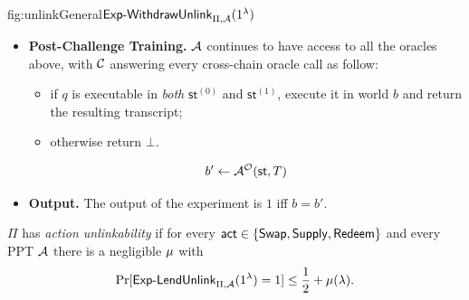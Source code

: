 \begin{ExpFig}{fig:unlinkGeneral}{$\mathsf{Exp\text{-}WithdrawUnlink}_{\Pi,\mathcal{A}}(1^{\lambda})$}
\begin{itemize}[leftmargin=1.4em,itemsep=3pt]
\begin{itemize}[nosep,leftmargin=1.4em]
\begin{enumerate}
    \item
     Let $\mathsf{st}^{(0)}$ and $\mathsf{st}^{(1)}$ denote the states of the honest
      parties in the two worlds: $\mathsf{st}^{(\beta)}$ is the state that results from
      running $\act$ on behalf of $\mathsf{shAcct}_{\beta}$. The challenger executes the
      challenge in world $b$ and \textbf{retains both} $\mathsf{st}^{(0)}$ and
      $\mathsf{st}^{(1)}$.
  \end{enumerate}
  \end{itemize}
\item \textbf{Post-Challenge Training.} $\mathcal{A}$ continues to have access to all the oracles above,  with $\mathcal{C}$ answering every cross-chain oracle call as follow:
      \begin{itemize}[nosep,leftmargin=1.4em,topsep=2pt]
      \item if $q$ is executable in \emph{both} $\mathsf{st}^{(0)}$ and
            $\mathsf{st}^{(1)}$, execute it in world $b$ and return the resulting
            transcript;
      \item otherwise return $\bot$.
      \end{itemize}
      $$b' \gets \mathcal{A}^{\mathcal{O}}(\mathsf{st}, T)$$
\item \textbf{Output.} The output of the experiment is $1$ iff $b = b'$.
\end{itemize}
\end{ExpFig}

\begin{definition}
\label{def:lendunlink}
$\Pi$ has \emph{action unlinkability} if for every $\mathsf{act} \in \{\mathsf{Swap},\mathsf{Supply},\mathsf{Redeem}\}$ and
every PPT $\mathcal{A}$ there is a negligible $\mu$ with
$$\Pr[\mathsf{Exp\text{-}LendUnlink}_{\Pi,\mathcal{A}}(1^{\lambda}) = 1] \le \frac12 + \mu(\lambda).$$
\end{definition}
